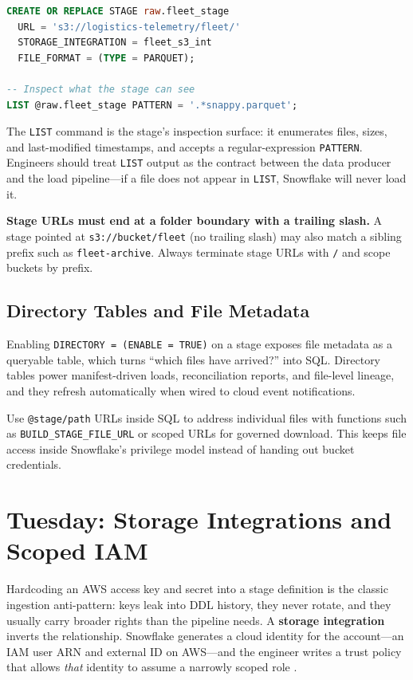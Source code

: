 \begin{lstlisting}[language=SQL, caption={A named external stage backed by a storage integration}]
CREATE OR REPLACE STAGE raw.fleet_stage
  URL = 's3://logistics-telemetry/fleet/'
  STORAGE_INTEGRATION = fleet_s3_int
  FILE_FORMAT = (TYPE = PARQUET);

-- Inspect what the stage can see
LIST @raw.fleet_stage PATTERN = '.*snappy.parquet';
\end{lstlisting}

The \texttt{LIST} command is the stage's inspection surface: it enumerates files, sizes, and last-modified timestamps, and accepts a regular-expression \texttt{PATTERN}. Engineers should treat \texttt{LIST} output as the contract between the data producer and the load pipeline---if a file does not appear in \texttt{LIST}, Snowflake will never load it.

\begin{pitfall}
\textbf{Stage URLs must end at a folder boundary with a trailing slash.} A stage pointed at \texttt{s3://bucket/fleet} (no trailing slash) may also match a sibling prefix such as \texttt{fleet-archive}. Always terminate stage URLs with \texttt{/} and scope buckets by prefix.
\end{pitfall}

\subsection{Directory Tables and File Metadata}
Enabling \texttt{DIRECTORY = (ENABLE = TRUE)} on a stage exposes file metadata as a queryable table, which turns ``which files have arrived?'' into SQL. Directory tables power manifest-driven loads, reconciliation reports, and file-level lineage, and they refresh automatically when wired to cloud event notifications.

\begin{tipbox}
Use \texttt{@stage/path} URLs inside SQL to address individual files with functions such as \texttt{BUILD\_STAGE\_FILE\_URL} or scoped URLs for governed download. This keeps file access inside Snowflake's privilege model instead of handing out bucket credentials.
\end{tipbox}

\section{Tuesday: Storage Integrations and Scoped IAM}
Hardcoding an AWS access key and secret into a stage definition is the classic ingestion anti-pattern: keys leak into DDL history, they never rotate, and they usually carry broader rights than the pipeline needs. A \textbf{storage integration} inverts the relationship. Snowflake generates a cloud identity for the account---an IAM user ARN and external ID on AWS---and the engineer writes a trust policy that allows \emph{that} identity to assume a narrowly scoped role \cite{snowflakeStorageIntegrationsDocs}.

